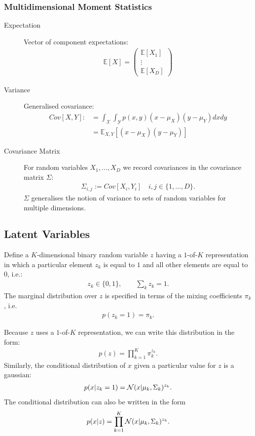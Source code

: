 \subsubsection{Multidimensional Moment Statistics}
\begin{description}
\item[Expectation] Vector of component expectations:
    \begin{align*}
        \mathbb E[X] = \begin{pmatrix}
                         \mathbb E[X_1]\\
                         \vdots\\
                         \mathbb E[X_D]
                       \end{pmatrix}
    \end{align*}
\item[Variance] Generalised covariance:
    \begin{align*}
        Cov[X,Y] :&= \int_{\mathcal X}\int_{\mathcal Y} p(x,y)(x-\mu_X)(y-\mu_Y) dxdy \\ 
        &=\mathbb E_{X,Y} [(x-\mu_X)(y-\mu_Y)]
    \end{align*}
\item[Covariance Matrix] For random variables $X_1, \ldots, X_D$ we record covariances in the covariance matrix $\Sigma$:
    \begin{align*}
        \Sigma_{i,j} := Cov[X_i,Y_i]\quad i,j \in \{1,\ldots, D\}.
    \end{align*}
    $\Sigma$ generalises the notion of variance to sets of random variables for multiple dimensions.

\end{description}

\subsection{Latent Variables}
Define a $K$-dimensional binary random variable $z$ having a $1$-of-$K$ representation in which a particular element $z_k$ is equal to $1$  and all other elements are equal to $0$, i.e.:
\begin{align*}
    z_k\in \{0,1\}, \qquad \sum_k z_k = 1.
\end{align*}
The marginal distribution over $z$ is specified in terms of the mixing coefficients $\pi_k$, i.e.
\begin{align*}
    p(z_k=1) = \pi_k.
\end{align*}


Because $z$ uses a $1$-of-$K$ representation, we can write this distribution in the form:
\begin{align*}
    p(z) = \prod_{k=1}^K \pi_k^{z_k}.
\end{align*}
Similarly, the conditional distribution of $x$ given a particular value for $z$ is a gaussian:
\begin{align*}
    p(x|z_k=1) = \mathcal N(x|\mu_k, \Sigma_k)^{z_k}.
\end{align*}
The conditional distribution can also be written in the form
\begin{align*}
    p(x|z) = \prod_{k=1}^K \mathcal N(x|\mu_k, \Sigma_k)^{z_k}.
\end{align*}

